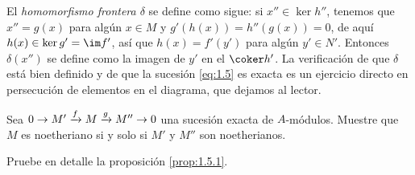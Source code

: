 El \emph{homomorfismo frontera $\delta$} se define como sigue: si $x'' \in \ker h''$, tenemos que $x'' = g(x)$ para algún $x \in M$ y $g'(h(x)) = h''(g(x)) = 0$, de aquí $h(x) \in \ker g' = \im f'$, así que $h(x) = f'(y')$ para algún $y' \in N'$. Entonces $\delta(x'')$ se define como la imagen de $y'$ en el $\coker h'$. La verificación de que $\delta$ está bien definido y de que la sucesión \eqref{eq:1.5} es exacta es un ejercicio directo en persecución de elementos en el diagrama, que dejamos al lector.



\ExerciseSection

\begin{ExerciseList}
  \item Sea $0 \to M' \xrightarrow{f} M \xrightarrow{g} M'' \to 0$ una sucesión exacta de $A$-módulos. Muestre que $M$ es noetheriano si y solo si $M'$ y $M''$ son noetherianos.
  \item Pruebe en detalle la proposición \ref{prop:1.5.1}.
\end{ExerciseList}